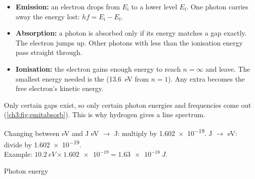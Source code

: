\begin{sidebyside}[0.4]
\begin{itemize}
    \item \textbf{Emission:} an electron drops from $E_\mathrm{i}$ to a lower level
          $E_\mathrm{f}$. One photon carries away the energy lost: $hf = E_\mathrm{i} -
          E_\mathrm{f}$.
    \item \textbf{Absorption:} a photon is absorbed only if its energy matches a gap
          exactly. The electron jumps up. Other photons with less than the ionisation
          energy pass straight through.
    \item \textbf{Ionisation:} the electron gains enough energy to reach $n = \infty$ and
          leave. The smallest energy needed is the  (\qty{13.6}{eV}
          from $n = 1$). Any extra becomes the free electron's kinetic energy.
  \end{itemize}
  Only certain gaps exist, so only certain photon energies and frequencies come out
  (\cref{ch3:fig:emitabsorb}). This is why hydrogen gives a line spectrum.
\end{sidebyside}

\begin{toolkit}{Changing between eV and J}
eV $\to$ J: multiply by \num{1.602e-19}. \quad J $\to$ eV: divide by \num{1.602e-19}.\\
Example: $\qty{10.2}{eV} \times \num{1.602e-19} = \qty{1.63e-18}{J}$.
\end{toolkit}

\begin{formulacard}{Photon energy}
  \begin{symbols}
  \end{symbols}
\end{formulacard}

